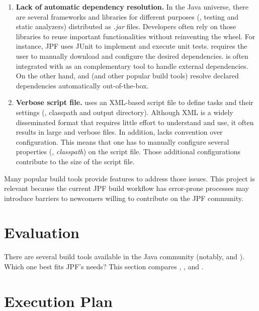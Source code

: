 \documentclass[a4paper, 12pt]{article}
\begin{document}
\begin{enumerate}

\item \textbf{Lack of automatic dependency resolution.}
In the Java universe, there are several frameworks and libraries for different
purposes (\eg, testing and static analyzers) distributed as \emph{.jar} files.
Developers often rely on those libraries to reuse important functionalities
without reinventing the wheel.
For instance, JPF uses JUnit to implement and execute unit tests.
\ant{} requires the user to manually download and configure the desired
dependencies.
\ant{} is often integrated with \ivy{} as an complementary tool to handle
external dependencies.
On the other hand, \gradle{} and \maven{} (and other popular build tools)
resolve declared dependencies automatically out-of-the-box.

\item \textbf{Verbose script file.}
\ant{} uses an XML-based script file to define tasks and their settings (\eg,
classpath and output directory).
Although XML is a widely disseminated format that requires little effort to
understand and use, it often results in large and verbose files.
In addition, \ant{} lacks convention over configuration.
This means that one has to manually configure several properties (\eg,
\emph{classpath}) on the script file.
Those additional configurations contribute to the size of the script file.

\end{enumerate}

Many popular build tools provide features to address those issues.
This project is relevant because the current JPF build workflow has error-prone
processes may introduce barriers to newcomers willing to contribute on the JPF
community.

\section{Evaluation}
\label{sec:evaluation}

There are several build tools available in the Java community (notably,
\maven{} and \gradle{}).
Which one best fits JPF's needs?
This section compares \maven{}, \gradle{}, and \sbt{}.



\section{Execution Plan}
\label{sec:plan}

\end{document}
